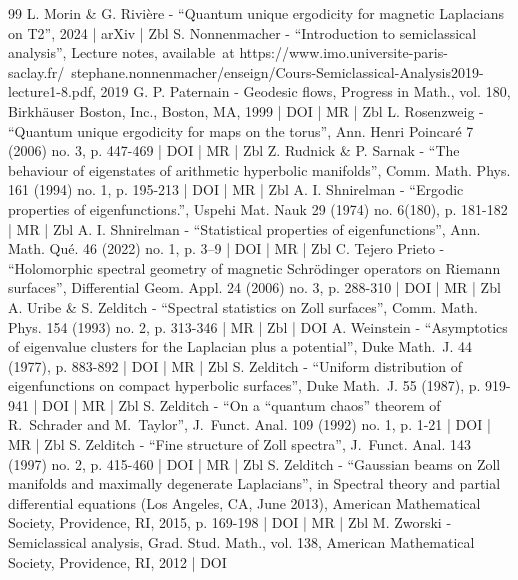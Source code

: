 \begin{thebibliography}{99}
L. Morin \& G. Rivière - “Quantum unique ergodicity for magnetic Laplacians on T2”, 2024 | arXiv | Zbl
S. Nonnenmacher - “Introduction to semiclassical analysis”, Lecture notes, available at https://www.imo.universite-paris-saclay.fr/ stephane.nonnenmacher/enseign/Cours-Semiclassical-Analysis2019-lecture1-8.pdf, 2019
G. P. Paternain - Geodesic flows, Progress in Math., vol. 180, Birkhäuser Boston, Inc., Boston, MA, 1999 | DOI | MR | Zbl
L. Rosenzweig - “Quantum unique ergodicity for maps on the torus”, Ann. Henri Poincaré 7 (2006) no. 3, p. 447-469 | DOI | MR | Zbl
Z. Rudnick \& P. Sarnak - “The behaviour of eigenstates of arithmetic hyperbolic manifolds”, Comm. Math. Phys. 161 (1994) no. 1, p. 195-213 | DOI | MR | Zbl
A. I. Shnirelman - “Ergodic properties of eigenfunctions.”, Uspehi Mat. Nauk 29 (1974) no. 6(180), p. 181-182 | MR | Zbl
A. I. Shnirelman - “Statistical properties of eigenfunctions”, Ann. Math. Qué. 46 (2022) no. 1, p. 3–9 | DOI | MR | Zbl
C. Tejero Prieto - “Holomorphic spectral geometry of magnetic Schrödinger operators on Riemann surfaces”, Differential Geom. Appl. 24 (2006) no. 3, p. 288-310 | DOI | MR | Zbl
A. Uribe \& S. Zelditch - “Spectral statistics on Zoll surfaces”, Comm. Math. Phys. 154 (1993) no. 2, p. 313-346 | MR | Zbl | DOI
A. Weinstein - “Asymptotics of eigenvalue clusters for the Laplacian plus a potential”, Duke Math. J. 44 (1977), p. 883-892 | DOI | MR | Zbl
S. Zelditch - “Uniform distribution of eigenfunctions on compact hyperbolic surfaces”, Duke Math. J. 55 (1987), p. 919-941 | DOI | MR | Zbl
S. Zelditch - “On a “quantum chaos” theorem of R. Schrader and M. Taylor”, J. Funct. Anal. 109 (1992) no. 1, p. 1-21 | DOI | MR | Zbl
S. Zelditch - “Fine structure of Zoll spectra”, J. Funct. Anal. 143 (1997) no. 2, p. 415-460 | DOI | MR | Zbl
S. Zelditch - “Gaussian beams on Zoll manifolds and maximally degenerate Laplacians”, in Spectral theory and partial differential equations (Los Angeles, CA, June 2013), American Mathematical Society, Providence, RI, 2015, p. 169-198 | DOI | MR | Zbl
M. Zworski - Semiclassical analysis, Grad. Stud. Math., vol. 138, American Mathematical Society, Providence, RI, 2012 | DOI
\end{thebibliography}
